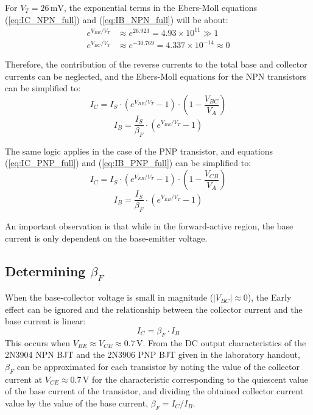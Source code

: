 \documentclass[12pt,a4paper]{article}
\begin{document}
For $V_T = 26\,\text{mV}$, the exponential terms in the Ebers-Moll equations
(\ref{eq:IC_NPN_full}) and (\ref{eq:IB_NPN_full}) will be about:
\begin{align*}
    e^{V_{BE}/V_T} &\approx e^{26.923} = 4.93\times10^{11} \gg 1 \\
    e^{V_{BC}/V_T} &\approx e^{-30.769}    = 4.337\times10^{-14} \approx 0
\end{align*}

Therefore, the contribution of the reverse currents to the total base and collector currents can
be neglected, and the Ebers-Moll equations for the NPN transistors can be simplified to:
\begin{equation}
    I_C = I_S \cdot \left(e^{V_{BE}/V_T} - 1\right) \cdot \left(1 - \frac{V_{BC}}{V_A}\right)
    \label{eq:IC_NPN}
\end{equation}
\begin{equation}
    I_B = \frac{I_S}{\beta_F} \cdot \left(e^{V_{BE}/V_T} - 1\right)
    \label{eq:IB_NPN}
\end{equation}

The same logic applies in the case of the PNP transistor, and equations
(\ref{eq:IC_PNP_full}) and (\ref{eq:IB_PNP_full}) can be simplified to:
\begin{equation}
    I_C = I_S \cdot \left(e^{V_{EB}/V_T} - 1\right) \cdot \left(1 - \frac{V_{CB}}{V_A}\right)
    \label{eq:IC_PNP}
\end{equation}
\begin{equation}
    I_B = \frac{I_S}{\beta_F} \cdot \left(e^{V_{EB}/V_T} - 1\right)
    \label{eq:IB_PNP}
\end{equation}

An important observation is that while in the forward-active region, the base current is only
dependent on the base-emitter voltage.

\subsection{Determining $\beta_F$}

When the base-collector voltage is small in magnitude ($|V_{BC}| \approx 0$), the Early effect
can be ignored and the relationship between the collector current and the base current is linear:
\[
    I_C = \beta_F \cdot I_B
\]
This occurs when $V_{BE} \approx V_{CE} \approx 0.7\,\text{V}$. From the DC output
characteristics of the 2N3904 NPN BJT and the 2N3906 PNP BJT given in the laboratory handout,
$\beta_F$ can be approximated for each transistor by noting the value of the collector current at
$V_{CE} \approx 0.7\,\text{V}$ for the characteristic corresponding to the quiescent value of the
base current of the transistor, and dividing the obtained collector current value by the value of
the base current, $\beta_F = I_C / I_B$.
\end{document}
